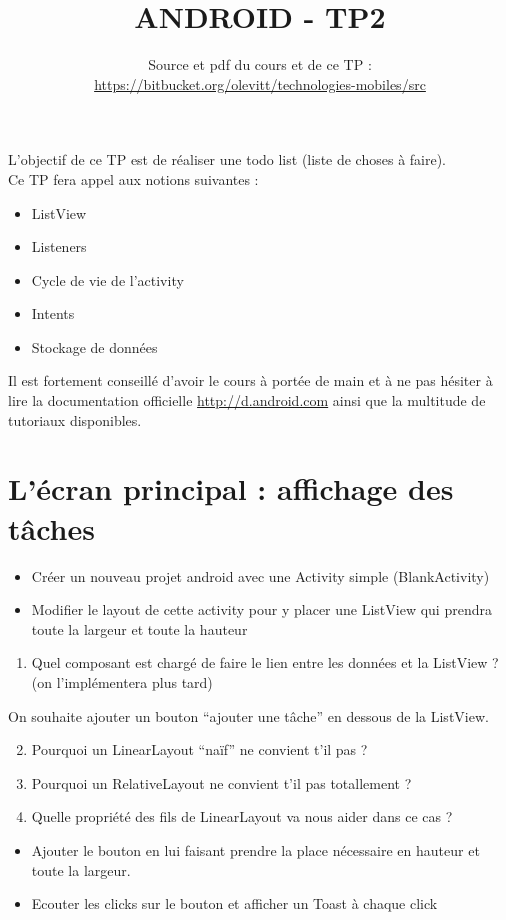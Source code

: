 \documentclass{article}
\title{ANDROID - TP2}
\date{Source et pdf du cours et de ce TP
:\\ \href{https://bitbucket.org/olevitt/technologies-mobiles}{https://bitbucket.org/olevitt/technologies-mobiles/src}}
\begin{document}
\maketitle
L'objectif de ce TP est de réaliser une todo list (liste de choses à faire).\\
Ce TP fera appel aux notions suivantes :
\begin{itemize}
  \item ListView
  \item Listeners
  \item Cycle de vie de l'activity
  \item Intents
  \item Stockage de données
\end{itemize}
Il est fortement conseillé d'avoir le cours à portée de main et à ne pas hésiter à lire la documentation officielle
\href{http://d.android.com}{http://d.android.com} ainsi que la multitude de tutoriaux disponibles.\\

\section{L'écran principal : affichage des tâches}
\begin{itemize}
  \item Créer un nouveau projet android avec une Activity simple (BlankActivity)
  \item Modifier le layout de cette activity pour y placer une ListView qui
  prendra toute la largeur et toute la hauteur
\end{itemize}
\begin{enumerate}
 \setcounter{enumi}{0}
 \item Quel composant est chargé de faire le lien entre les données et la
 ListView ? (on l'implémentera plus tard)
 \end{enumerate}
 On souhaite ajouter un bouton ``ajouter une tâche'' en dessous de la ListView.
 \begin{enumerate}
 \setcounter{enumi}{1}
\item Pourquoi un LinearLayout ``naïf'' ne convient t'il pas ?
\item Pourquoi un RelativeLayout ne convient t'il pas totallement ?
\item Quelle propriété des fils de LinearLayout va nous aider dans ce cas ?
\end{enumerate}
\begin{itemize}
  \item Ajouter le bouton en lui faisant prendre la place nécessaire en hauteur
  et toute la largeur.
  \item Ecouter les clicks sur le bouton et afficher un Toast à chaque click
\end{itemize}
\end{document}
